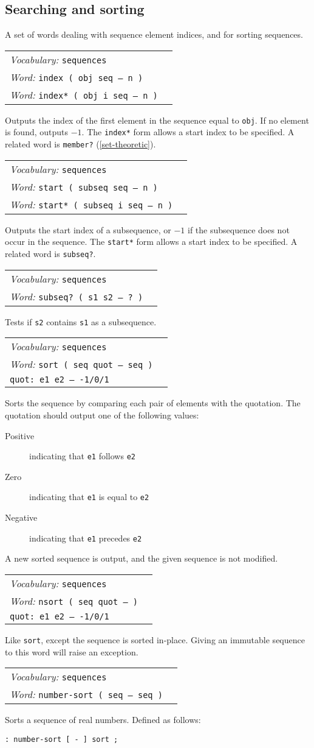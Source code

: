 \documentclass{book}
\newcommand{\vocabulary}[1]{\emph{Vocabulary:} \texttt{#1}&\\}
\newcommand{\ordinaryword}[2]{\index{\texttt{#1}}\emph{Word:} \texttt{#2}&\\}
\newcommand{\wordtable}[1]{


\begin{tabularx}{12cm}{lX}
\hline
#1
\hline
\end{tabularx}

}
\begin{document}
\subsection{Searching and sorting}\label{seq-searching}

A set of words dealing with sequence element indices, and for sorting sequences.

\wordtable{
\vocabulary{sequences}
\ordinaryword{index}{index ( obj seq -- n )}
\ordinaryword{index*}{index* ( obj i seq -- n )}
}
Outputs the index of the first element in the sequence equal to \texttt{obj}. If no element is found, outputs $-1$. The \verb|index*| form allows a start index to be specified. A related word is \verb|member?| (\ref{set-theoretic}).
\wordtable{
\vocabulary{sequences}
\ordinaryword{start}{start ( subseq seq -- n )}
\ordinaryword{start*}{start* ( subseq i seq -- n )}
}
Outputs the start index of a subsequence, or $-1$ if the subsequence does not occur in the sequence. The \verb|start*| form allows a start index to be specified. A related word is \verb|subseq?|.
\wordtable{
\vocabulary{sequences}
\ordinaryword{subseq?}{subseq?~( s1 s2 -- ?~)}
}
Tests if \texttt{s2} contains \texttt{s1} as a subsequence.

\wordtable{
\vocabulary{sequences}
\ordinaryword{sort}{sort~( seq quot -- seq )}
\texttt{quot:~e1 e2 -- -1/0/1}\\
}
Sorts the sequence by comparing each pair of elements with the quotation. The quotation should output one of the following values:
\begin{description}
\item[Positive] indicating that \texttt{e1} follows \texttt{e2}
\item[Zero] indicating that \texttt{e1} is equal to \texttt{e2}
\item[Negative] indicating that \texttt{e1} precedes \texttt{e2}
\end{description}
A new sorted sequence is output, and the given sequence is not modified.

\wordtable{
\vocabulary{sequences}
\ordinaryword{nsort}{nsort~( seq quot -- )}
\texttt{quot:~e1 e2 -- -1/0/1}\\
}
Like \verb|sort|, except the sequence is sorted in-place. Giving an immutable sequence to this word will raise an exception.

\wordtable{
\vocabulary{sequences}
\ordinaryword{number-sort}{number-sort~( seq -- seq )}
}
Sorts a sequence of real numbers. Defined as follows:
\begin{verbatim}
: number-sort [ - ] sort ;
\end{verbatim}
\end{document}
